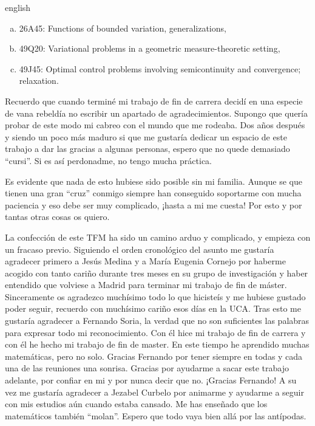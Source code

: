 \documentclass[a4paper,11pt,spanish, twoside, leqno]{tfm-uam}
\begin{document}
\begin{classification}{english}
\begin{enumerate}[(a)]
\item 26A45: Functions of bounded variation, generalizations,
\item 49Q20: Variational problems in a geometric measure-theoretic setting,
\item 49J45: Optimal control problems involving semicontinuity and convergence; relaxation.
\end{enumerate}
\end{classification}

\begin{agradecimientos}

Recuerdo que cuando terminé mi trabajo de fin de carrera decidí en una especie de vana rebeldía no escribir un apartado de agradecimientos. Supongo que quería probar de este modo mi cabreo con el mundo que me rodeaba. Dos años después y siendo un poco más maduro si que me gustaría dedicar un espacio de este trabajo a dar las gracias a algunas personas, espero que no quede demasiado ``cursi''. Si es así perdonadme, no tengo mucha práctica.

Es evidente que nada de esto hubiese sido posible sin mi familia. Aunque se que tienen una gran ``cruz'' conmigo siempre han conseguido soportarme con mucha paciencia y eso debe ser muy complicado, ¡hasta a mi me cuesta! Por esto y por tantas otras cosas os quiero. 

La confección de este TFM ha sido un camino arduo y complicado, y empieza con un fracaso previo. Siguiendo el orden cronológico del asunto me gustaría agradecer primero a Jesús Medina y a María Eugenia Cornejo por haberme acogido con tanto cariño durante tres meses en su grupo de investigación y haber entendido que volviese a Madrid para terminar mi trabajo de fin de máster. Sinceramente os agradezco muchísimo todo lo que hicisteís y me hubiese gustado poder seguir, recuerdo con muchísimo cariño esos días en la UCA. Tras esto me gustaría agradecer a Fernando Soria, la verdad que no son suficientes las palabras para expresar todo mi reconocimiento. Con él hice mi trabajo de fin de carrera y con él he hecho mi trabajo de fin de master. En este tiempo he aprendido muchas matemáticas, pero no solo. Gracias Fernando por tener siempre en todas y cada una de las reuniones una sonrisa. Gracias por ayudarme a sacar este trabajo adelante, por confiar en mi y por nunca decir que no. ¡Gracias Fernando! A su vez me gustaría agradecer a Jezabel Curbelo por animarme y ayudarme a seguir con mis estudios aún cuando estaba cansado. Me has enseñado que los matemáticos también ``molan''. Espero que todo vaya bien allá por las antípodas.


\end{agradecimientos}
\end{document}
